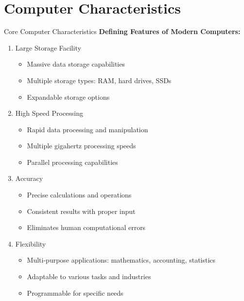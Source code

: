 \documentclass[aspectratio=169]{beamer}
\begin{document}
\section{Computer Characteristics}

\begin{frame}{Core Computer Characteristics}
    \textbf{Defining Features of Modern Computers:}
    
    \begin{enumerate}
        \item Large Storage Facility
        \begin{itemize}
            \item Massive data storage capabilities
            \item Multiple storage types: RAM, hard drives, SSDs
            \item Expandable storage options
        \end{itemize}
        
        \item High Speed Processing
        \begin{itemize}
            \item Rapid data processing and manipulation
            \item Multiple gigahertz processing speeds
            \item Parallel processing capabilities
        \end{itemize}
        
        \item Accuracy
        \begin{itemize}
            \item Precise calculations and operations
            \item Consistent results with proper input
            \item Eliminates human computational errors
        \end{itemize}
        
        \item Flexibility
        \begin{itemize}
            \item Multi-purpose applications: mathematics, accounting, statistics
            \item Adaptable to various tasks and industries
            \item Programmable for specific needs
        \end{itemize}
    \end{enumerate}
\end{frame}
\end{document}
